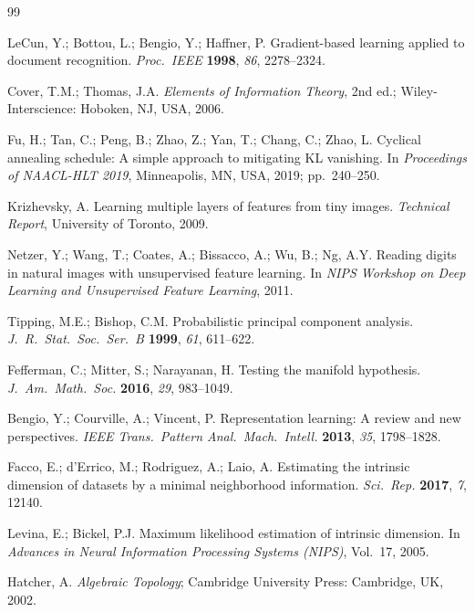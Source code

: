 \documentclass[11pt,a4paper]{article}
\begin{document}
\begin{thebibliography}{99}

LeCun, Y.; Bottou, L.; Bengio, Y.; Haffner, P.
Gradient-based learning applied to document recognition.
\textit{Proc.\ IEEE} \textbf{1998}, \textit{86}, 2278--2324.

Cover, T.M.; Thomas, J.A.
\textit{Elements of Information Theory}, 2nd ed.;
Wiley-Interscience: Hoboken, NJ, USA, 2006.

Fu, H.; Tan, C.; Peng, B.; Zhao, Z.; Yan, T.; Chang, C.; Zhao, L.
Cyclical annealing schedule: A simple approach to mitigating {KL} vanishing.
In \textit{Proceedings of NAACL-HLT 2019}, Minneapolis, MN, USA, 2019; pp.~240--250.

Krizhevsky, A.
Learning multiple layers of features from tiny images.
\textit{Technical Report}, University of Toronto, 2009.

Netzer, Y.; Wang, T.; Coates, A.; Bissacco, A.; Wu, B.; Ng, A.Y.
Reading digits in natural images with unsupervised feature learning.
In \textit{NIPS Workshop on Deep Learning and Unsupervised Feature Learning}, 2011.

Tipping, M.E.; Bishop, C.M.
Probabilistic principal component analysis.
\textit{J.~R.~Stat.~Soc.\ Ser.\ B} \textbf{1999}, \textit{61}, 611--622.

Fefferman, C.; Mitter, S.; Narayanan, H.
Testing the manifold hypothesis.
\textit{J.~Am.~Math.~Soc.} \textbf{2016}, \textit{29}, 983--1049.

Bengio, Y.; Courville, A.; Vincent, P.
Representation learning: A review and new perspectives.
\textit{IEEE Trans.~Pattern Anal.~Mach.~Intell.} \textbf{2013}, \textit{35}, 1798--1828.

Facco, E.; d'Errico, M.; Rodriguez, A.; Laio, A.
Estimating the intrinsic dimension of datasets by a minimal neighborhood information.
\textit{Sci.~Rep.} \textbf{2017}, \textit{7}, 12140.

Levina, E.; Bickel, P.J.
Maximum likelihood estimation of intrinsic dimension.
In \textit{Advances in Neural Information Processing Systems (NIPS)}, Vol.~17, 2005.

Hatcher, A. \textit{Algebraic Topology};
Cambridge University Press: Cambridge, UK, 2002.


\end{thebibliography}
\end{document}
